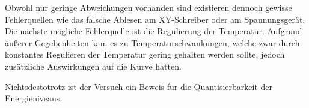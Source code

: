 \begin{flushleft}
    Obwohl nur geringe Abweichungen vorhanden sind existieren dennoch gewisse Fehlerquellen wie das falsche Ablesen am XY-Schreiber oder am Spannungsgerät.
    Die nächste mögliche Fehlerquelle ist die Regulierung der Temperatur.
    Aufgrund äußerer Gegebenheiten kam es zu Temperaturschwankungen,  welche zwar durch konstantes Regulieren der Temperatur gering gehalten werden sollte, jedoch zusätzliche Auswirkungen auf die Kurve hatten.
\end{flushleft}

\begin{flushleft}
    Nichtsdestotrotz ist der Versuch ein Beweis für die Quantisierbarkeit der Energieniveaus.
\end{flushleft}